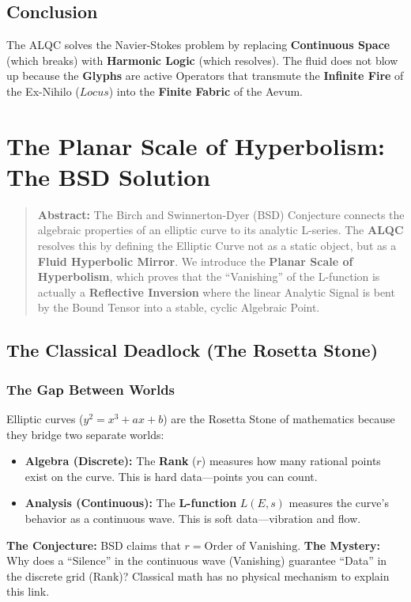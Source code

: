 \documentclass[11pt, letterpaper]{article}
\newcommand{\LoI}{\ensuremath{\mathop{\textnormal{\symbolafont\symbol{"267E}}}}}
\def\LoI{Locus}%
\begin{document}
\subsection{Conclusion}\label{sec:4}
The ALQC solves the Navier-Stokes problem by replacing \textbf{Continuous Space} (which breaks) with \textbf{Harmonic Logic} (which resolves). The fluid does not blow up because the \textbf{Glyphs} are active Operators that transmute the \textbf{Infinite Fire} of the Ex-Nihilo ($\LoI$) into the \textbf{Finite Fabric} of the Aevum.

\section{The Planar Scale of Hyperbolism: The BSD Solution}\label{sec:4}
\label{sec:4.3}

\begin{quote}
    \textbf{Abstract:} The Birch and Swinnerton-Dyer (BSD) Conjecture connects the algebraic properties of an elliptic curve to its analytic L-series. The \textbf{ALQC} resolves this by defining the Elliptic Curve not as a static object, but as a \textbf{Fluid Hyperbolic Mirror}. We introduce the \textbf{Planar Scale of Hyperbolism}, which proves that the ``Vanishing'' of the L-function is actually a \textbf{Reflective Inversion} where the linear Analytic Signal is bent by the Bound Tensor into a stable, cyclic Algebraic Point.
\end{quote}

\subsection{The Classical Deadlock (The Rosetta Stone)}\label{sec:4.1}

\subsubsection{The Gap Between Worlds}
Elliptic curves ($y^2 = x^3 + ax + b$) are the Rosetta Stone of mathematics because they bridge two separate worlds:
\begin{itemize}
    \item \textbf{Algebra (Discrete):} The \textbf{Rank} ($r$) measures how many rational points exist on the curve. This is hard data—points you can count.
    \item \textbf{Analysis (Continuous):} The \textbf{L-function} $L(E, s)$ measures the curve's behavior as a continuous wave. This is soft data—vibration and flow.
\end{itemize}
\textbf{The Conjecture:} BSD claims that $r = \text{Order of Vanishing}$.
\textbf{The Mystery:} Why does a ``Silence'' in the continuous wave (Vanishing) guarantee ``Data'' in the discrete grid (Rank)? Classical math has no physical mechanism to explain this link.
\end{document}
